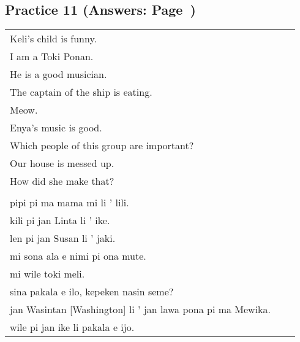 \subsection*{Practice 11 (Answers: Page~\pageref{'pi'})}
%
\begin{supertabular}{p{5,5cm}|ll}
Keli's child is funny.    \\ %
I am a Toki Ponan.   \\  %
He is a good musician.   \\  %
The captain of the ship is eating.    \\ %
Meow.    \\ %
Enya's music is good.    \\ %
Which people of this group are important?    \\ %
Our house is messed up.    \\ %
How did she make that?    \\ %
 && \\ %
pipi pi ma mama mi li ' lili.  \\ %
kili pi jan Linta li ' ike.    \\ %
len pi jan Susan li ' jaki.    \\ %
mi sona ala e nimi pi ona mute.    \\ %
mi wile toki meli.    \\ %
sina pakala e ilo, kepeken nasin seme?    \\ %
jan Wasintan [Washington] li ' jan lawa pona pi ma Mewika.  \\   %
wile pi jan ike li pakala e ijo.    \\ %
\end{supertabular}  
